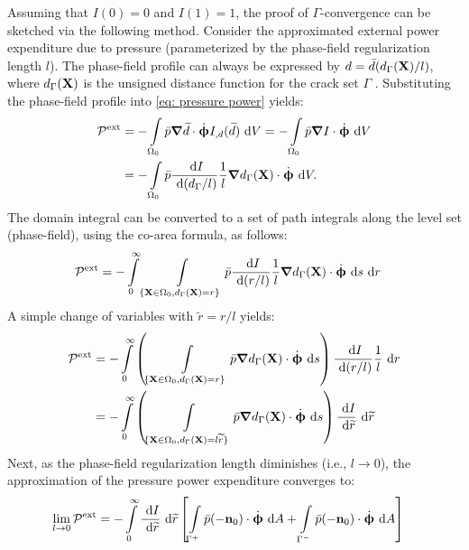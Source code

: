 Assuming that $I(0)=0$ and $I(1)=1$, the proof of $\Gamma$-convergence can be sketched via the following method. Consider the approximated external power expenditure due to pressure (parameterized by the phase-field regularization length $l$). The phase-field profile can always be expressed by $d = \bar{d}(d_\Gamma(\textbf{X})/l)$, where $d_\Gamma(\textbf{X})$ is the unsigned distance function for the crack set $\Gamma$ \cite{JYWu2017}. Substituting the phase-field profile into \eqref{eq: pressure power} yields:
\begin{equation}
  \begin{aligned}
    \mathcal{P}^\text{ext} & = - \int\limits_{\Omega_0} \bar{p} \boldsymbol{\nabla} \widetilde{d} \cdot \dot{\boldsymbol{\upphi}} I_{,d}(\widetilde{d}) \text{ d}V = - \int\limits_{\Omega_0} \bar{p} \boldsymbol{\nabla} I \cdot \dot{\boldsymbol{\upphi}} \text{ d}V \\
                           & = - \int\limits_{\Omega_0} \bar{p} \dfrac{\text{ d}I}{\text{ d}(d_\Gamma/l)} \dfrac{1}{l} \boldsymbol{\nabla} d_\Gamma(\textbf{X}) \cdot \dot{\boldsymbol{\upphi}} \text{ d}V.                                    
  \end{aligned}
\end{equation}
The domain integral can be converted to a set of path integrals along the level set (phase-field), using the co-area formula, as follows:
\begin{align}
  \mathcal{P}^\text{ext} & = - \int\limits_0^\infty \int\limits_{\{ \textbf{X}\in{\Omega_0}, d_\Gamma(\textbf{X})=r \}} \bar{p} \dfrac{\text{ d}I}{\text{ d}(r/l)} \dfrac{1}{l} \boldsymbol{\nabla} d_\Gamma(\textbf{X}) \cdot \dot{\boldsymbol{\upphi}} \text{ d}s \text{ d}r 
\end{align}
A simple change of variables with $\widetilde{r}=r/l$ yields:
\begin{equation}
  \begin{aligned}
    \mathcal{P}^\text{ext} & = - \int\limits_0^\infty \left( \int\limits_{\{ \textbf{X}\in{\Omega_0}, d_\Gamma(\textbf{X})=r \}} \bar{p} \boldsymbol{\nabla} d_\Gamma(\textbf{X}) \cdot \dot{\boldsymbol{\upphi}} \text{ d}s \right) \dfrac{\text{ d}I}{\text{ d}(r/l)} \dfrac{1}{l} \text{ d}r                     \\
                           & = - \int\limits_0^\infty \left( \int\limits_{\{ \textbf{X}\in{\Omega_0}, d_\Gamma(\textbf{X})=l\widetilde{r} \}} \bar{p} \boldsymbol{\nabla} d_\Gamma(\textbf{X}) \cdot \dot{\boldsymbol{\upphi}} \text{ d}s \right) \dfrac{\text{ d}I}{\text{ d}\widetilde{r}} \text{ d}\widetilde{r} 
  \end{aligned}
\end{equation}
Next, as the phase-field regularization length diminishes (i.e., $l \to 0$), the approximation of the pressure power expenditure converges to:
\begin{subequations}
  \begin{align}
    \lim_{l \to 0} \mathcal{P}^\text{ext} & = - \int\limits_0^\infty \dfrac{\text{ d}I}{\text{ d}\widetilde{r}} \text{ d}\widetilde{r} \left[ \int\limits_{\Gamma^+} \bar{p} (-\textbf{n}_0) \cdot \dot{\boldsymbol{\upphi}} \text{ d}A + \int\limits_{\Gamma^-} \bar{p} (-\textbf{n}_0) \cdot \dot{\boldsymbol{\upphi}} \text{ d}A \right] 
  \end{align}
\end{subequations}
